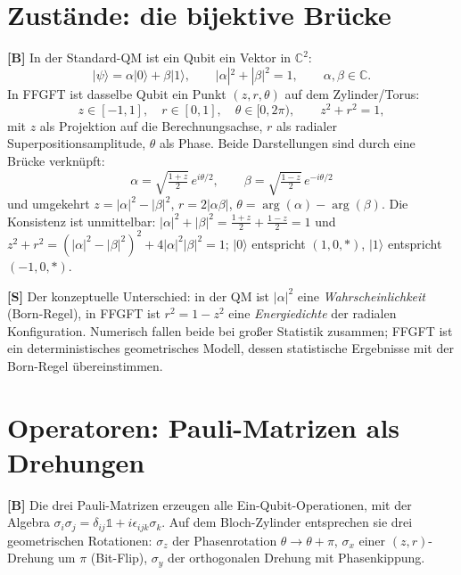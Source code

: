 \section{Zustände: die bijektive Brücke}

\textbf{[B]} In der Standard-QM ist ein Qubit ein Vektor in $\mathbb{C}^2$:
\[
  |\psi\rangle = \alpha|0\rangle + \beta|1\rangle,
  \qquad |\alpha|^2 + |\beta|^2 = 1,\qquad \alpha,\beta\in\mathbb{C}.
\]
In FFGFT ist dasselbe Qubit ein Punkt $(z,r,\theta)$ auf dem Zylinder/Torus:
\[
  z\in[-1,1],\quad r\in[0,1],\quad \theta\in[0,2\pi),\qquad z^2+r^2=1,
\]
mit $z$ als Projektion auf die Berechnungsachse, $r$ als radialer
Superpositionsamplitude, $\theta$ als Phase. Beide Darstellungen sind durch eine
Brücke verknüpft:
\[
  \boxed{\;
  \alpha = \sqrt{\tfrac{1+z}{2}}\,e^{i\theta/2},
  \qquad
  \beta = \sqrt{\tfrac{1-z}{2}}\,e^{-i\theta/2}\;}
\]
und umgekehrt $z = |\alpha|^2-|\beta|^2$, $r = 2|\alpha\beta|$,
$\theta = \arg(\alpha)-\arg(\beta)$. Die Konsistenz ist unmittelbar:
$|\alpha|^2+|\beta|^2 = \tfrac{1+z}{2}+\tfrac{1-z}{2}=1$ und
$z^2+r^2 = (|\alpha|^2-|\beta|^2)^2 + 4|\alpha|^2|\beta|^2 = 1$; $|0\rangle$
entspricht $(1,0,*)$, $|1\rangle$ entspricht $(-1,0,*)$.

\textbf{[S]} Der konzeptuelle Unterschied: in der QM ist $|\alpha|^2$ eine
\emph{Wahrscheinlichkeit} (Born-Regel), in FFGFT ist $r^2 = 1-z^2$ eine
\emph{Energiedichte} der radialen Konfiguration. Numerisch fallen beide bei
großer Statistik zusammen; FFGFT ist ein deterministisches geometrisches Modell,
dessen statistische Ergebnisse mit der Born-Regel übereinstimmen.

\section{Operatoren: Pauli-Matrizen als Drehungen}

\textbf{[B]} Die drei Pauli-Matrizen erzeugen alle Ein-Qubit-Operationen, mit der
Algebra $\sigma_i\sigma_j = \delta_{ij}\mathbb{1} + i\epsilon_{ijk}\sigma_k$. Auf
dem Bloch-Zylinder entsprechen sie drei geometrischen Rotationen: $\sigma_z$ der
Phasenrotation $\theta\to\theta+\pi$, $\sigma_x$ einer $(z,r)$-Drehung um $\pi$
(Bit-Flip), $\sigma_y$ der orthogonalen Drehung mit Phasenkippung.

